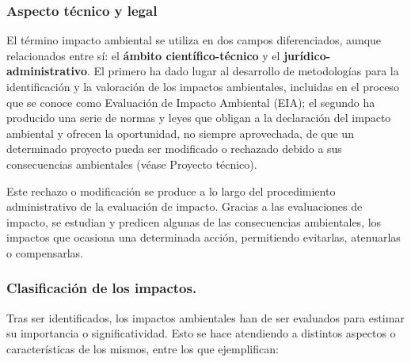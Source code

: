 \subsubsection{Aspecto técnico y legal}

El término impacto ambiental se utiliza en dos campos diferenciados, aunque
relacionados entre sí: el \textbf{ámbito científico-técnico} y el \textbf{jurídico-administrativo}. El primero
ha dado lugar al desarrollo de metodologías para la identificación y la valoración de los
impactos ambientales, incluidas en el proceso que se conoce como Evaluación de
Impacto Ambiental (EIA); el segundo ha producido una serie de normas y leyes que
obligan a la declaración del impacto ambiental y ofrecen la oportunidad, no siempre
aprovechada, de que un determinado proyecto pueda ser modificado o rechazado
debido a sus consecuencias ambientales (véase Proyecto técnico).

Este rechazo o modificación se produce a lo largo del procedimiento administrativo de la evaluación de
impacto. Gracias a las evaluaciones de impacto, se estudian y predicen algunas de las
consecuencias ambientales, los impactos que ocasiona una determinada acción,
permitiendo evitarlas, atenuarlas o compensarlas.

\subsubsection{Clasificación de los impactos.}

Tras ser identificados, los impactos ambientales han de ser evaluados para
estimar su importancia o significatividad. Esto se hace atendiendo a distintos aspectos o
características de los mismos, entre los que ejemplifican:


